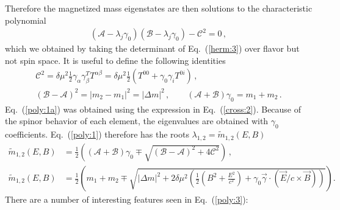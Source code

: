 \documentclass[addchapnum]{ws-rv961x669} %
\newcommand{\req}[1]{Eq.~(\ref{#1})}
\begin{document}
Therefore the magnetized mass eigenstates are then solutions to the characteristic polynomial
\begin{align}
    \label{poly:1}
    (\mathcal{A}-\lambda_{j}\gamma_{0})(\mathcal{B}-\lambda_{j}\gamma_{0})-\mathcal{C}^{2}=0\,,
\end{align}
which we obtained by taking the determinant of \req{herm:3} over flavor but not spin space. It is useful to define the following identities
\begin{align}
    \label{poly:1a}
    \mathcal{C}^{2} = \delta\mu^{2}\frac{1}{2}\gamma_{\alpha}\gamma_{\beta}^{T}T^{\alpha\beta} = 
    \delta\mu^{2}\frac{1}{2}\left(T^{00}+\gamma_{0}\gamma_{i}T^{0i}\right)\,,\\
    (\mathcal{B}-\mathcal{A})^{2} = |m_{2}-m_{1}|^{2} = |\Delta m|^{2}\,,\qquad (\mathcal{A}+\mathcal{B})\gamma_{0} = m_{1} + m_{2}\,.
\end{align}
\req{poly:1a} was obtained using the expression in \req{cross:2}. Because of the spinor behavior of each element, the eigenvalues are obtained with $\gamma_{0}$ coefficients. \req{poly:1} therefore has the roots $\lambda_{1,2} = \widetilde m_{1,2}(E,B)$
\begin{align}
    \label{poly:2}
    \widetilde m_{1,2}(E,B)\! &=\! \frac{1}{2}\left((\mathcal{A}+\mathcal{B})\gamma_{0}\mp\sqrt{(\mathcal{B}-\mathcal{A})^{2}+4\mathcal{C}^{2}}\right)\,,\\
    \label{poly:3}
    \widetilde m_{1,2}(E,B)\! &=\! \frac{1}{2}\left(m_{1}\!+\!m_{2}\!\mp\!\sqrt{|\Delta m|^{2}\!+\!2\delta\mu^{2}\left(\frac{1}{2}\left(B^{2}\!+\!\frac{E^{2}}{c^{2}}\right)\!+\!\gamma_{0}\vec{\gamma}\!\cdot\!(\vec{E}/c\times\vec{B})\right)}\right)\!.
\end{align}
There are a number of interesting features seen in \req{poly:3}:
\end{document}
